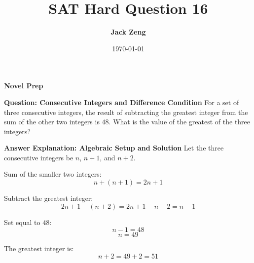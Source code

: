 \documentclass{beamer}
\title[SAT Hard Question]{\textbf{SAT Hard Question 16}}
\author{\textbf{Jack Zeng}}
\institute{\textcolor{white}{\textbf{Novel Prep}}}
\date{\today}
\begin{document}
\begin{frame}
    \titlepage
    \vfill
    \begin{flushright}
        \textcolor{purpleblue}{\Huge \textbf{Novel Prep}}
    \end{flushright}
\end{frame}


\begin{frame}
\end{frame}



\begin{frame}{\textbf{Question: Consecutive Integers and Difference Condition}}
\small
For a set of three consecutive integers, the result of subtracting the greatest integer from the sum of the other two integers is $48$. What is the value of the greatest of the three integers?
\end{frame}

\begin{frame}{\textbf{Answer Explanation: Algebraic Setup and Solution}}
\small
Let the three consecutive integers be $n$, $n+1$, and $n+2$.

Sum of the smaller two integers:
\[
n + (n + 1) = 2n + 1
\]

Subtract the greatest integer:
\[
2n + 1 - (n + 2) = 2n + 1 - n - 2 = n - 1
\]

Set equal to $48$:
\[
n - 1 = 48
\]
\[
n = 49
\]

The greatest integer is:
\[
n + 2 = 49 + 2 = \boxed{51}
\]
\end{frame}
\end{document}
